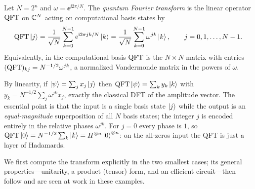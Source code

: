 \begin{definition}
\label{def:lec04-qft}
Let $N=2^{n}$ and $\omega=\ee^{\ii 2\pi/N}$. The \emph{quantum Fourier transform}
is the linear operator $\mathrm{QFT}$ on $\mathbb{C}^{N}$ acting on computational basis states by
\[
  \mathrm{QFT}\ket{j}=\frac{1}{\sqrt N}\sum_{k=0}^{N-1}\mathrm{e}^{\mathrm{i} 2\pi jk/N}\ket{k}
             =\frac{1}{\sqrt N}\sum_{k=0}^{N-1}\omega^{jk}\ket{k},
  \qquad j=0,1,\dots,N-1.
\]
Equivalently, in the computational basis $\mathrm{QFT}$ is the $N\times N$ matrix with
entries $(\mathrm{QFT})_{kj}=N^{-1/2}\omega^{jk}$, a normalized Vandermonde matrix in the
powers of $\omega$.
\end{definition}

By linearity, if $\ket{\psi}=\sum_j x_j\ket{j}$ then $\mathrm{QFT}\ket{\psi}=\sum_k
y_k\ket{k}$ with $y_k=N^{-1/2}\sum_j\omega^{jk}x_j$, exactly the classical DFT of
the amplitude vector. The essential point is that the input is a single basis
state $\ket{j}$ while the output is an \emph{equal-magnitude} superposition of all
$N$ basis states; the integer $j$ is encoded entirely in the relative phases
$\omega^{jk}$. For $j=0$ every phase is $1$, so $\mathrm{QFT}\ket{0}=N^{-1/2}\sum_k\ket{k}
=H^{\otimes n}\ket{0}^{\otimes n}$: on the all-zeros input the QFT is just a layer
of Hadamards.


We first compute the transform explicitly in the two smallest cases; its general
properties---unitarity, a product (tensor) form, and an efficient circuit---then
follow and are seen at work in these examples.

